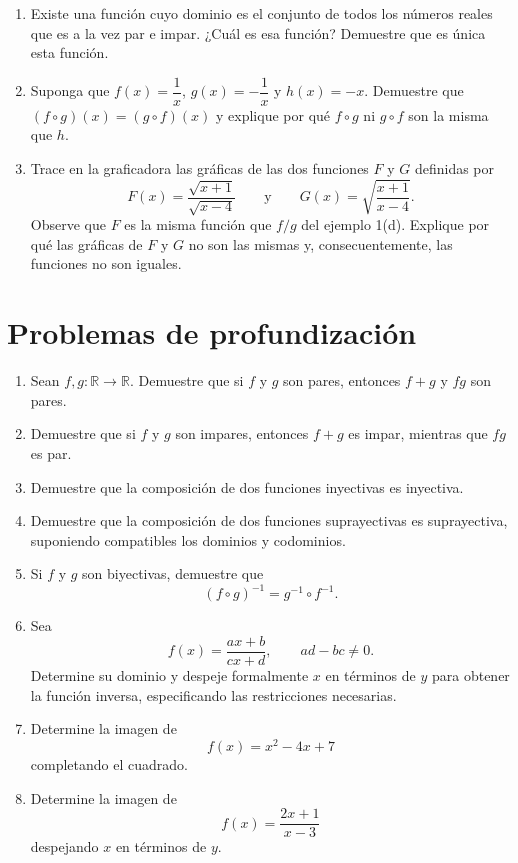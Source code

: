 \documentclass[12pt]{article}
\theoremstyle{remark}
\newcommand{\R}{\mathbb{R}}
\begin{document}
\begin{enumerate}[start=46]
\item Existe una función cuyo dominio es el conjunto de todos los números reales que es a la vez par e impar. ¿Cuál es esa función? Demuestre que es única esta función.
\item Suponga que $f(x)=\dfrac1x$, $g(x)=-\dfrac1x$ y $h(x)=-x$. Demuestre que $(f\circ g)(x)=(g\circ f)(x)$ y explique por qué $f\circ g$ ni $g\circ f$ son la misma que $h$.
\item Trace en la graficadora las gráficas de las dos funciones $F$ y $G$ definidas por
\[
F(x)=\frac{\sqrt{x+1}}{\sqrt{x-4}}
\qquad\text{y}\qquad
G(x)=\sqrt{\frac{x+1}{x-4}}.
\]
Observe que $F$ es la misma función que $f/g$ del ejemplo 1(d). Explique por qué las gráficas de $F$ y $G$ no son las mismas y, consecuentemente, las funciones no son iguales.
\end{enumerate}


\newpage
\section{Problemas de profundización}

\begin{enumerate}
    \item Sean $f,g:\R\to\R$. Demuestre que si $f$ y $g$ son pares, entonces
    $f+g$ y $fg$ son pares.

    \item Demuestre que si $f$ y $g$ son impares, entonces $f+g$ es impar,
    mientras que $fg$ es par.

    \item Demuestre que la composición de dos funciones inyectivas es
    inyectiva.

    \item Demuestre que la composición de dos funciones suprayectivas es
    suprayectiva, suponiendo compatibles los dominios y codominios.

    \item Si $f$ y $g$ son biyectivas, demuestre que
    \[
    (f\circ g)^{-1}=g^{-1}\circ f^{-1}.
    \]

    \item Sea
    \[
    f(x)=\frac{ax+b}{cx+d},
    \qquad ad-bc\neq0.
    \]
    Determine su dominio y despeje formalmente $x$ en términos de $y$ para
    obtener la función inversa, especificando las restricciones necesarias.

    \item Determine la imagen de
    \[
    f(x)=x^2-4x+7
    \]
    completando el cuadrado.

    \item Determine la imagen de
    \[
    f(x)=\frac{2x+1}{x-3}
    \]
    despejando $x$ en términos de $y$.
\end{enumerate}
\end{document}
